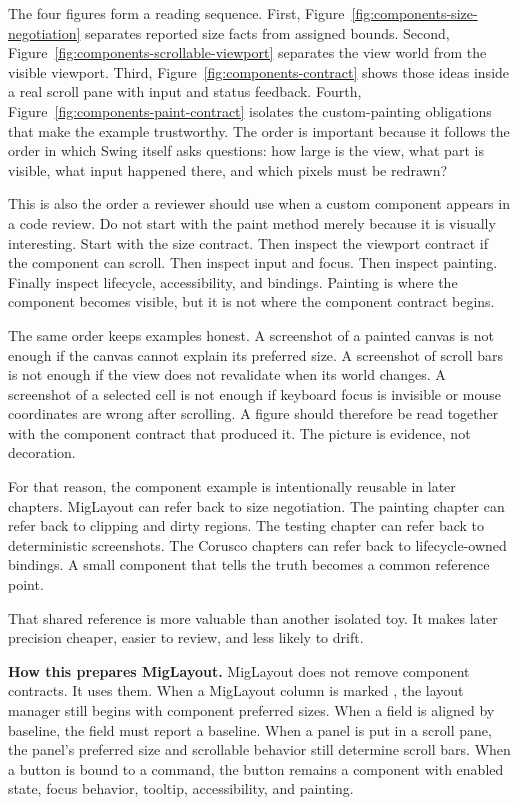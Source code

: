 The four figures form a reading sequence. First, Figure~\ref{fig:components-size-negotiation} separates reported size facts from assigned bounds. Second, Figure~\ref{fig:components-scrollable-viewport} separates the view world from the visible viewport. Third, Figure~\ref{fig:components-contract} shows those ideas inside a real scroll pane with input and status feedback. Fourth, Figure~\ref{fig:components-paint-contract} isolates the custom-painting obligations that make the example trustworthy. The order is important because it follows the order in which Swing itself asks questions: how large is the view, what part is visible, what input happened there, and which pixels must be redrawn?

This is also the order a reviewer should use when a custom component appears in a code review. Do not start with the paint method merely because it is visually interesting. Start with the size contract. Then inspect the viewport contract if the component can scroll. Then inspect input and focus. Then inspect painting. Finally inspect lifecycle, accessibility, and bindings. Painting is where the component becomes visible, but it is not where the component contract begins.

The same order keeps examples honest. A screenshot of a painted canvas is not enough if the canvas cannot explain its preferred size. A screenshot of scroll bars is not enough if the view does not revalidate when its world changes. A screenshot of a selected cell is not enough if keyboard focus is invisible or mouse coordinates are wrong after scrolling. A figure should therefore be read together with the component contract that produced it. The picture is evidence, not decoration.

For that reason, the component example is intentionally reusable in later chapters. MigLayout can refer back to size negotiation. The painting chapter can refer back to clipping and dirty regions. The testing chapter can refer back to deterministic screenshots. The Corusco chapters can refer back to lifecycle-owned bindings. A small component that tells the truth becomes a common reference point.

That shared reference is more valuable than another isolated toy. It makes later precision cheaper, easier to review, and less likely to drift.

\textbf{How this prepares MigLayout.} MigLayout does not remove component contracts. It uses them. When a MigLayout column is marked , the layout manager still begins with component preferred sizes. When a field is aligned by baseline, the field must report a baseline. When a panel is put in a scroll pane, the panel's preferred size and scrollable behavior still determine scroll bars. When a button is bound to a command, the button remains a component with enabled state, focus behavior, tooltip, accessibility, and painting.

